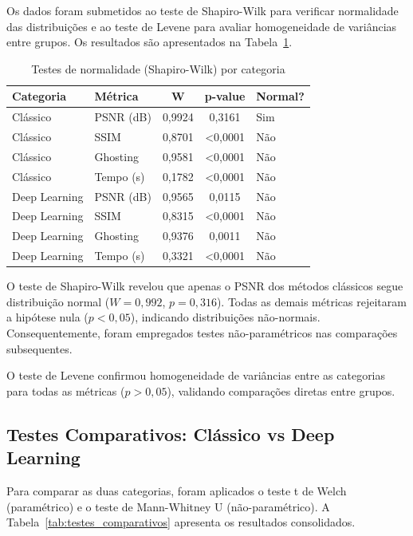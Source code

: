 Os dados foram submetidos ao teste de Shapiro-Wilk para verificar normalidade das distribuições e ao teste de Levene para avaliar homogeneidade de variâncias entre grupos. Os resultados são apresentados na Tabela~\ref{tab:normalidade}.

\begin{table}[htb]
\centering
\caption{Testes de normalidade (Shapiro-Wilk) por categoria}
\label{tab:normalidade}
\small
\begin{tabular}{llccl}
\hline
\textbf{Categoria} & \textbf{Métrica} & \textbf{W} & \textbf{p-value} & \textbf{Normal?} \\ \hline
Clássico & PSNR (dB) & 0,9924 & 0,3161 & Sim \\
Clássico & SSIM & 0,8701 & <0,0001 & Não \\
Clássico & Ghosting & 0,9581 & <0,0001 & Não \\
Clássico & Tempo (s) & 0,1782 & <0,0001 & Não \\
Deep Learning & PSNR (dB) & 0,9565 & 0,0115 & Não \\
Deep Learning & SSIM & 0,8315 & <0,0001 & Não \\
Deep Learning & Ghosting & 0,9376 & 0,0011 & Não \\
Deep Learning & Tempo (s) & 0,3321 & <0,0001 & Não \\
\hline
\end{tabular}
\end{table}

O teste de Shapiro-Wilk revelou que apenas o PSNR dos métodos clássicos segue distribuição normal ($W=0{,}992$, $p=0{,}316$). Todas as demais métricas rejeitaram a hipótese nula ($p<0{,}05$), indicando distribuições não-normais. Consequentemente, foram empregados testes não-paramétricos nas comparações subsequentes.

O teste de Levene confirmou homogeneidade de variâncias entre as categorias para todas as métricas ($p>0{,}05$), validando comparações diretas entre grupos.

\subsection{Testes Comparativos: Clássico vs Deep Learning}

Para comparar as duas categorias, foram aplicados o teste t de Welch (paramétrico) e o teste de Mann-Whitney U (não-paramétrico). A Tabela~\ref{tab:testes_comparativos} apresenta os resultados consolidados.

